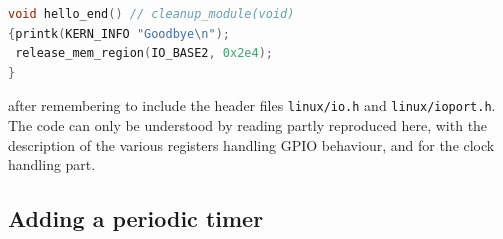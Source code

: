 \documentclass{article}
\begin{document}
{{{\begin{lstlisting}[language=C]
void hello_end() // cleanup_module(void)
{printk(KERN_INFO "Goodbye\n");
 release_mem_region(IO_BASE2, 0x2e4);
}
\end{lstlisting}

\noindent
after remembering to include the header files {\tt linux/io.h} and {\tt linux/ioport.h}.
The code can only be understood by reading \cite[p.1347]{zynq} partly reproduced here, with
the description of the various registers handling GPIO behaviour, and \cite[p.1580]{zynq} 
for the clock handling part.

%
%
%
%
%
%
%
%

\subsection{Adding a periodic timer}

}}}
\end{document}
